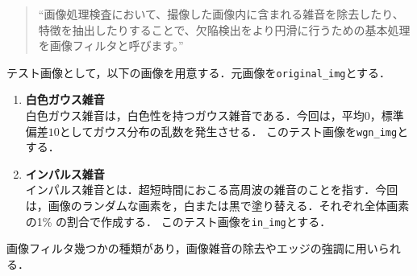 \begin{quote}
    ``画像処理検査において、撮像した画像内に含まれる雑音を除去したり、特徴を抽出したりすることで、欠陥検出をより円滑に行うための基本処理を画像フィルタと呼びます。''\hfill\cite{画像フィルタ}
\end{quote}
\newcommand{\originimg}{\texttt{original\_img}}
テスト画像として，以下の画像を用意する．元画像を\originimg とする．
\setlength{\columnseprule}{0.1mm}
\begin{enumerate}
    \item \textbf{白色ガウス雑音}\\
          \newcommand{\wgnimg}{\texttt{wgn\_img}}
          白色ガウス雑音は，白色性を持つガウス雑音である．今回は，平均\(0\)，標準偏差\(10\)としてガウス分布の乱数を発生させる．
          このテスト画像を\wgnimg とする．
    \item \textbf{インパルス雑音}\\
          \newcommand{\inimg}{\texttt{in\_img}}
          インパルス雑音とは．超短時間におこる高周波の雑音のことを指す．今回は，画像のランダムな画素を，白または黒で塗り替える．それぞれ全体画素の1\% の割合で作成する．
          このテスト画像を\inimg とする．
\end{enumerate}
画像フィルタ幾つかの種類があり，画像雑音の除去やエッジの強調に用いられる．
